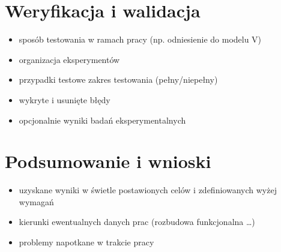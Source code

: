 \documentclass[a4paper,twoside,12pt]{book}
\begin{document}
\chapter{Weryfikacja i walidacja}
\label{ch:06}
\begin{itemize}
\item sposób testowania w ramach pracy (np. odniesienie do modelu V)
\item organizacja eksperymentów
\item przypadki testowe zakres testowania (pełny/niepełny)
\item wykryte i usunięte błędy
\item opcjonalnie wyniki badań eksperymentalnych
\end{itemize}



\chapter{Podsumowanie i wnioski}
\begin{itemize}
\item uzyskane wyniki w świetle postawionych celów i zdefiniowanych wyżej wymagań
\item kierunki ewentualnych danych prac (rozbudowa funkcjonalna …)
\item problemy napotkane w trakcie pracy
\end{itemize}



\backmatter

\printbibliography           %
\end{document}

